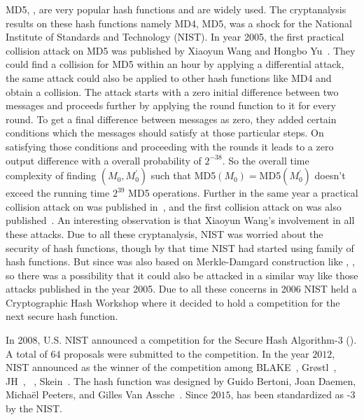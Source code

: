 MD5, ,  are very popular hash functions and are widely used. The cryptanalysis results on these hash functions namely MD4, MD5,  was a shock for the National Institute of Standards and Technology (NIST). In year 2005, the first practical collision attack on MD5 was published by Xiaoyun Wang and Hongbo Yu~\cite{wang2005break}. They could find a collision for MD5 within an hour by applying a differential attack, the same attack could also be applied to other hash functions like MD4 and obtain a collision. The attack starts with a zero initial difference between two messages and proceeds further by applying the round function to it for every round. To get a final difference between messages as zero, they added certain conditions which the messages should satisfy at those particular steps. On satisfying those conditions and proceeding with the rounds it leads to a zero output difference with a overall probability of $2^{-38}$. So the overall time complexity of finding $(M_0, M^\prime_0)$ such that MD5$(M_0) = $MD5$(M^\prime_0)$ doesn't exceed the running time $2^{39}$ MD5 operations. Further in the same year a practical collision attack on  was published in~\cite{wang2005efficient}, and the first collision attack on  was also published~\cite{wang2005finding}. An interesting observation is that Xiaoyun Wang's involvement in all these attacks. Due to all these cryptanalysis, NIST was worried about the security of hash functions, though by that time NIST had started using  family of hash functions. But since  was also based on Merkle-Damgard construction like , , so there was a possibility that it could also be attacked in a similar way like those attacks published in the year 2005. Due to all these concerns in 2006 NIST held a Cryptographic Hash Workshop where it decided to hold a competition for the next secure hash function.

In 2008, U.S. NIST announced a competition for the Secure Hash Algorithm-3 (). A total of $64$ proposals were submitted to the competition. In the year $2012$, NIST announced \KECCAK{} as the winner of the competition among BLAKE~\cite{aumasson2008sha}, Gr\o stl~\cite{gauravaram2011s}, JH~\cite{wu2011hash}, \KECCAK{}~\cite{bertonikeccak}, Skein~\cite{fergusonskein}. The \KECCAK{} hash function was designed by Guido Bertoni, Joan Daemen, Micha\"{e}l Peeters, and Gilles Van Assche~\cite{bertoni2009keccak}. Since $2015$, \KECCAK{} has been standardized as \SHA-$3$ by the NIST.

\section{\KECCAK{}}

